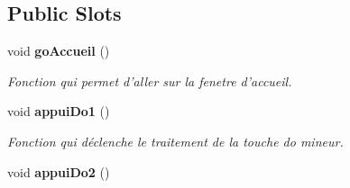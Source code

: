 \subsection*{Public Slots}
\begin{DoxyCompactItemize}
\item 
void {\bf go\-Accueil} ()
\begin{DoxyCompactList}\small\item\em Fonction qui permet d'aller sur la fenetre d'accueil. \end{DoxyCompactList}\item 
void {\bf appui\-Do1} ()
\begin{DoxyCompactList}\small\item\em Fonction qui déclenche le traitement de la touche do mineur. \end{DoxyCompactList}\item 
void {\bfseries appui\-Do2} ()\label{class_entrainement_facile_afc632a43affef76c28967b624c59a781}


\end{DoxyCompactItemize}
